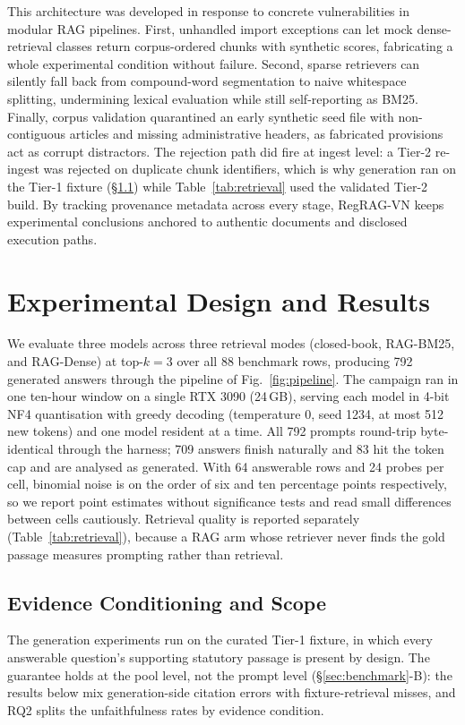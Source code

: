 \documentclass[conference,a4paper]{IEEEtran}
\begin{document}
This architecture was developed in response to concrete vulnerabilities in modular RAG pipelines. First, unhandled import exceptions can let mock dense-retrieval classes return corpus-ordered chunks with synthetic scores, fabricating a whole experimental condition without failure. Second, sparse retrievers can silently fall back from compound-word segmentation to naive whitespace splitting, undermining lexical evaluation while still self-reporting as BM25. Finally, corpus validation quarantined an early synthetic seed file with non-contiguous articles and missing administrative headers, as fabricated provisions act as corrupt distractors. The rejection path did fire at ingest level: a Tier-2 re-ingest was rejected on duplicate chunk identifiers, which is why generation ran on the Tier-1 fixture (\S\ref{sec:disclosure}) while Table~\ref{tab:retrieval} used the validated Tier-2 build. By tracking provenance metadata across every stage, RegRAG-VN keeps experimental conclusions anchored to authentic documents and disclosed execution paths.

\section{Experimental Design and Results}
\label{sec:results}

We evaluate three models across three retrieval modes (closed-book, RAG-BM25, and RAG-Dense) at top-$k=3$ over all 88 benchmark rows, producing 792 generated answers through the pipeline of Fig.~\ref{fig:pipeline}. The campaign ran in one ten-hour window on a single RTX 3090 (24\,GB), serving each model in 4-bit NF4 quantisation with greedy decoding (temperature 0, seed 1234, at most 512 new tokens) and one model resident at a time. All 792 prompts round-trip byte-identical through the harness; 709 answers finish naturally and 83 hit the token cap and are analysed as generated. With 64 answerable rows and 24 probes per cell, binomial noise is on the order of six and ten percentage points respectively, so we report point estimates without significance tests and read small differences between cells cautiously. Retrieval quality is reported separately (Table~\ref{tab:retrieval}), because a RAG arm whose retriever never finds the gold passage measures prompting rather than retrieval.

\subsection{Evidence Conditioning and Scope}
\label{sec:disclosure}
The generation experiments run on the curated Tier-1 fixture, in which every answerable question's supporting statutory passage is present by design. The guarantee holds at the pool level, not the prompt level (\S\ref{sec:benchmark}-B): the results below mix generation-side citation errors with fixture-retrieval misses, and RQ2 splits the unfaithfulness rates by evidence condition.
\end{document}
